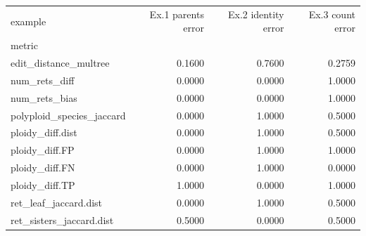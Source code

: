 \begin{tabular}{lrrr}
\toprule
example & Ex.1 parents error & Ex.2 identity error & Ex.3 count error \\
metric &  &  &  \\
\midrule
edit_distance_multree & 0.1600 & 0.7600 & 0.2759 \\
num_rets_diff & 0.0000 & 0.0000 & 1.0000 \\
num_rets_bias & 0.0000 & 0.0000 & 1.0000 \\
polyploid_species_jaccard & 0.0000 & 1.0000 & 0.5000 \\
ploidy_diff.dist & 0.0000 & 1.0000 & 0.5000 \\
ploidy_diff.FP & 0.0000 & 1.0000 & 1.0000 \\
ploidy_diff.FN & 0.0000 & 1.0000 & 0.0000 \\
ploidy_diff.TP & 1.0000 & 0.0000 & 1.0000 \\
ret_leaf_jaccard.dist & 0.0000 & 1.0000 & 0.5000 \\
ret_sisters_jaccard.dist & 0.5000 & 0.0000 & 0.5000 \\
\bottomrule
\end{tabular}
